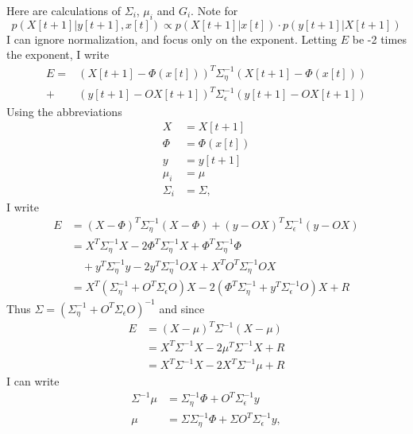 \documentclass[12pt]{article}
\begin{document}
Here are calculations of $\Sigma_i$, $\mu_i$ and $G_i$.  Note for
\begin{equation*}
  p(X[t+1]|y[t+1], x[t]) \propto p(X[t+1]|x[t]) \cdot p(y[t+1]|X[t+1])
\end{equation*}
I can ignore normalization, and focus only on the exponent.
Letting $E$ be -2 times the exponent, I write
\begin{align*}
  E = & \left( X[t+1] - \Phi(x[t]) \right)^T \Sigma_\eta^{-1} \left(
    X[t+1] - \Phi(x[t]) \right) \\ +& \left( y[t+1] - O X[t+1] \right)^T
  \Sigma_\epsilon^{-1} \left( y[t+1] - O X[t+1] \right)
\end{align*}
Using the abbreviations
\begin{align*}
  X &= X[t+1] \\
  \Phi &= \Phi(x[t]) \\
  y &= y[t+1] \\
  \mu_i &= \mu \\
  \Sigma_i &= \Sigma,
\end{align*}
I write
\begin{align}
  \label{eq:AbbrevE}
  E &= \left( X-\Phi \right)^T \Sigma_\eta^{-1} \left( X-\Phi \right) +
  \left( y - OX \right)^T \Sigma_\epsilon^{-1} \left( y - OX \right)
  \\ \nonumber
  &= X^T \Sigma_\eta^{-1} X -2 \Phi^T \Sigma_\eta^{-1} X + \Phi^T
    \Sigma_\eta^{-1} \Phi \\ \nonumber
    &\quad + y^T \Sigma_\eta^{-1} y - 2 y^T \Sigma_\eta^{-1} OX +
      X^TO^T \Sigma_\eta^{-1} OX \\  \nonumber
  &= X^T\left(\Sigma_\eta^{-1} + O^T \Sigma_\epsilon O \right) X - 2
    \left( \Phi^T \Sigma_\eta^{-1} + y^T \Sigma_\epsilon^{-1} O
    \right) X + R
\end{align}
Thus $\Sigma = \left(\Sigma_\eta^{-1} + O^T \Sigma_\epsilon O
\right)^{-1}$ and since
\begin{align*}
  E &= (X-\mu)^T \Sigma^{-1}(X-\mu) \\
    &= X^T \Sigma^{-1} X - 2\mu^T\Sigma^{-1} X + R \\
    &= X^T \Sigma^{-1} X - 2X^T \Sigma^{-1} \mu + R
\end{align*}
I can write
\begin{align*}
  \Sigma^{-1} \mu &= \Sigma_\eta^{-1} \Phi + O^T \Sigma_\epsilon^{-1}
                    y \\
               \mu &= \Sigma\Sigma_\eta^{-1} \Phi + \Sigma O^T
                     \Sigma_\epsilon^{-1} y,
\end{align*}
\end{document}
